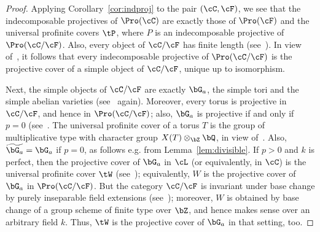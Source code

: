 \begin{proof}
Applying Corollary~\ref{cor:indproj} to the pair $(\cC,\cF)$, we see that the indecomposable projectives of $\Pro(\cC)$ are exactly those of $\Pro(\cF)$ and the universal profinite covers $\tP$, where $P$ is an indecomposable projective of $\Pro(\cC/\cF)$. Also, every object of $\cC/\cF$ has finite length (see~\cite[Prop.~3.2]{Br17a}). In view of~\cite[V.2.4.6]{DG}, it follows that every indecomposable projective of $\Pro(\cC/\cF)$ is the projective cover of a simple object of $\cC/\cF$, unique up to isomorphism.

Next, the simple objects of $\cC/\cF$ are exactly $\bG_a$, the simple tori and the simple abelian varieties (see~\cite[Prop.~3.2]{Br17a} again). Moreover, every torus is projective in $\cC/\cF$, and hence in $\Pro(\cC/\cF)$; also, $\bG_a$ is projective if and only if $p = 0$ (see~\cite[Thm.~5.14]{Br17a}. The universal profinite cover of a torus $T$ is the group of multiplicative type with character group $X(T) \otimes_{\bZ} \bQ$, in view of~\cite[V.3.5.2]{DG}. Also, $\widetilde{\bG_a} = \bG_a$ if $p = 0$, as follows e.g. from Lemma~\ref{lem:divisible}. If $p > 0$ and $k$ is perfect, then the projective cover of $\bG_a$ in $\cL$ (or equivalently, in $\cC$) is the universal profinite cover $\tW$ (see~\cite[V.3.7.5]{DG}); equivalently, $W$ is the projective cover of $\bG_a$ in $\Pro(\cC/\cF)$. But the category $\cC/\cF$ is invariant under base change by purely inseparable field extensions (see~\cite[Thm.~3.11]{Br17a}); moreover, $W$ is obtained by base change of a group scheme of finite type over $\bZ$, and hence makes sense over an arbitrary field $k$. Thus, $\tW$ is the projective cover of $\bG_a$ in that setting, too.
\end{proof}



